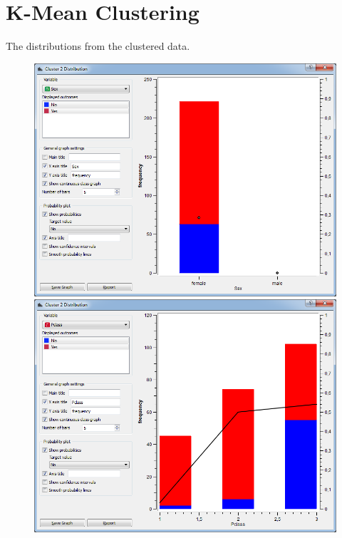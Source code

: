\documentclass[a4paper,11pt]{article}
\begin{document}
\section{K-Mean Clustering}
\label{appenCluster}
The distributions from the clustered data.
\begin{figure}[h]
	\centering
	\begin{center}
		\includegraphics[scale=0.30]{ClusterDistribution/Cluster2/Sex}
		\includegraphics[scale=0.30]{ClusterDistribution/Cluster2/PClass}\\
		\vspace{1 mm}

\end{center}
\end{figure}
\end{document}

